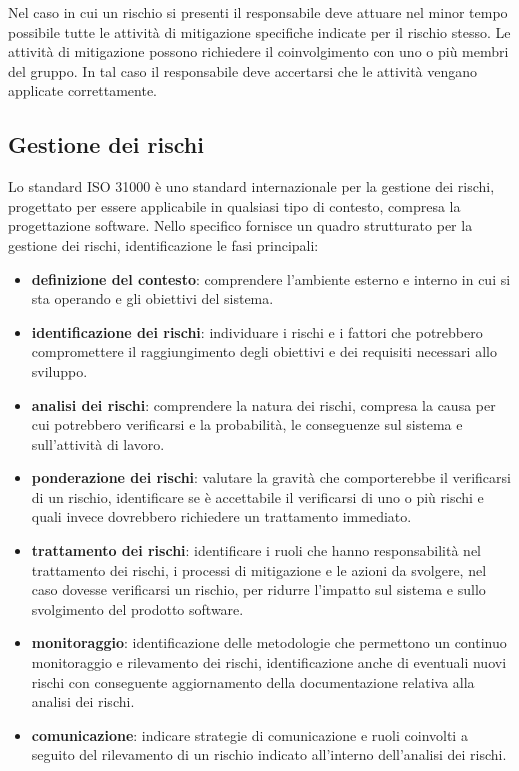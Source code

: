 \begin{enumerate}
    Nel caso in cui un rischio si presenti il responsabile deve attuare nel minor tempo possibile tutte le attività di mitigazione specifiche indicate per il rischio stesso.
    Le attività di mitigazione possono richiedere il coinvolgimento con uno o più membri del gruppo.
    In tal caso il responsabile deve accertarsi che le attività vengano applicate correttamente. 
\end{enumerate}

\subsection{Gestione dei rischi}
Lo standard ISO 31000 è uno standard internazionale per la gestione dei rischi, progettato per essere applicabile  in qualsiasi tipo di contesto, compresa la progettazione software.
Nello specifico fornisce un quadro strutturato per la gestione dei rischi, identificazione le fasi principali: 
\begin{itemize}
    \item \textbf{definizione del contesto}: comprendere l'ambiente esterno e interno in cui si sta operando e gli obiettivi del sistema.
    \item \textbf{identificazione dei rischi}: individuare i rischi e i fattori che potrebbero compromettere il raggiungimento degli obiettivi e dei requisiti necessari allo sviluppo.
    \item \textbf{analisi dei rischi}:  comprendere la natura dei rischi, compresa la causa per cui potrebbero verificarsi e la probabilità, le conseguenze sul sistema e sull'attività di lavoro.
    \item \textbf{ponderazione dei rischi}: valutare la gravità che comporterebbe il verificarsi di un rischio, identificare se è accettabile il verificarsi di uno o più rischi e quali invece dovrebbero richiedere un trattamento immediato.
    \item \textbf{trattamento dei rischi}: identificare i ruoli che hanno responsabilità nel trattamento dei rischi, i processi di mitigazione e le azioni da svolgere, nel caso dovesse verificarsi un rischio, per ridurre l'impatto sul sistema e sullo svolgimento del prodotto software. 
    \item \textbf{monitoraggio}: identificazione delle metodologie che permettono un continuo monitoraggio e rilevamento dei rischi, identificazione anche di eventuali nuovi rischi con conseguente aggiornamento della documentazione relativa alla analisi dei rischi.
    \item \textbf{comunicazione}: indicare strategie di comunicazione e ruoli coinvolti a seguito del rilevamento di un rischio indicato all'interno dell'analisi dei rischi.
\end{itemize}
